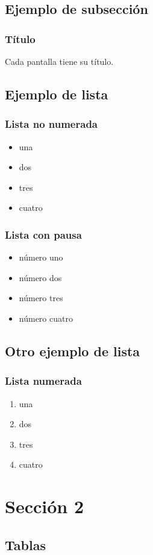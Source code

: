 \documentclass{beamer}
\begin{document}
\subsection{Ejemplo de subsección}
\begin{frame}
\frametitle{Título} 
Cada pantalla tiene su título.
\end{frame}

\subsection{Ejemplo de lista}

\begin{frame}
\frametitle{Lista no numerada}
\begin{itemize}
\item una  
\item dos 
\item tres 
\item cuatro
\end{itemize} 
\end{frame}

\begin{frame}
\frametitle{Lista con pausa}
\begin{itemize}
\item número uno \pause 
\item número dos \pause 
\item número tres \pause 
\item número cuatro
\end{itemize} 
\end{frame}

\subsection{Otro ejemplo de lista}
\begin{frame}
\frametitle{Lista numerada}
\begin{enumerate}
\item una  
\item dos 
\item tres 
\item cuatro
\end{enumerate}
\end{frame}

\section{Sección 2} 
\subsection{Tablas}
\end{document}
